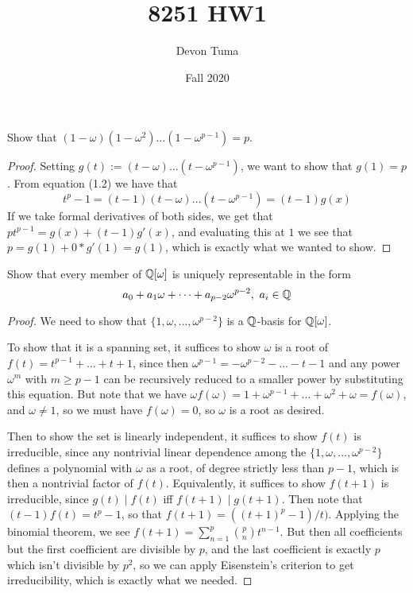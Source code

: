 \documentclass[11pt]{article}
\title{8251 HW1}
\author{Devon Tuma}
\date{Fall 2020}
\begin{document}
\maketitle

Show that $(1 - \omega)(1 - \omega^2)\dots(1 - \omega^{p-1}) = p$.

\begin{proof}
  Setting $g(t) := (t - \omega)\dots(t - \omega^{p-1})$, we want to show that $g(1) = p$.
  From equation (1.2) we have that
  \begin{equation*}
    t^p - 1 = (t - 1)(t - \omega)\dots(t - \omega^{p-1}) = (t-1)g(x)
  \end{equation*}
  If we take formal derivatives of both sides, we get that $pt^{p-1} = g(x) + (t-1)g'(x)$, and evaluating this at $1$ we see that $p = g(1) + 0 * g'(1) = g(1)$, which is exactly what we wanted to show.
\end{proof}


Show that every member of $\mathbb{Q}[\omega]$ is uniquely representable in the form $$a_0 + a_1\omega + \dots + a_{p-2}\omega^{p-2}, \ a_i \in \mathbb{Q}$$

\begin{proof}
  We need to show that $\{1, \omega, \dots, \omega^{p-2}\}$ is a $\mathbb{Q}$-basis for $\mathbb{Q}[\omega]$.
  
  To show that it is a spanning set, it suffices to show $\omega$ is a root of $f(t) = t^{p-1} + \dots + t + 1$, since then $\omega^{p-1} = -\omega^{p-2}-\dots-t-1$ and any power $\omega^m$ with $m \ge p - 1$ can be recursively reduced to a smaller power by substituting this equation.
  But note that we have $\omega f(\omega) = 1 + \omega^{p-1} + \dots + \omega^2 + \omega = f(\omega)$, and $\omega \ne 1$, so we must have $f(\omega) = 0$, so $\omega$ is a root as desired.

  Then to show the set is linearly independent, it suffices to show $f(t)$ is irreducible, since any nontrivial linear dependence among the $\{1, \omega, \dots, \omega^{p-2}\}$ defines a polynomial with $\omega$ as a root, of degree strictly less than $p-1$, which is then a nontrivial factor of $f(t)$.
  Equivalently, it suffices to show $f(t+1)$ is irreducible, since $g(t) \mid f(t)$ iff $f(t+1) \mid g(t+1)$. Then note that $(t-1)f(t) = t^p - 1$, so that $f(t+1) = ((t+1)^p - 1) / t)$.
  Applying the binomial theorem, we see $f(t+1) = \sum_{n = 1}^p \binom{p}{n} t^{n-1}$.
  But then all coefficients but the first coefficient are divisible by $p$, and the last coefficient is exactly $p$ which isn't divisible by $p^2$, so we can apply Eisenstein's criterion to get irreducibility, which is exactly what we needed.
\end{proof}
\end{document}
